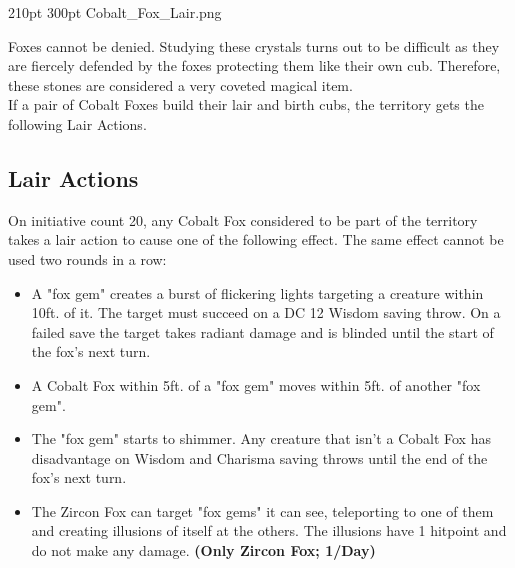 
\MonsterBannerGraphic%
	{}%
	{210pt}%
	{300pt}%
	{Cobalt_Fox_Lair.png}%
	{}%
	
%
	
Foxes cannot be denied. Studying these crystals turns out to be difficult as they are fiercely defended by the foxes protecting them like their own cub. Therefore, these stones are considered a very coveted magical item.\\
If a pair of Cobalt Foxes build their lair and birth cubs, the territory gets the following Lair Actions.

\subsection*{Lair Actions}
On initiative count 20, any Cobalt Fox considered to be part of the territory takes a lair action to cause one of the following effect. The same effect cannot be used two rounds in a row:
\begin{itemize}
	\item A "fox gem" creates a burst of flickering lights targeting a creature within 10ft. of it. The target must succeed on a DC 12 Wisdom saving throw. On a failed save the target takes  radiant damage and is blinded until the start of the fox's next turn.
	\item A Cobalt Fox within 5ft. of a "fox gem" moves within 5ft. of another "fox gem".
	\item The "fox gem" starts to shimmer. Any creature that isn't a Cobalt Fox has disadvantage on Wisdom and Charisma saving throws until the end of the fox's next turn.
	\item The Zircon Fox can target  "fox gems" it can see, teleporting to one of them and creating illusions of itself at the others. The illusions have 1 hitpoint and do not make any damage. \textbf{(Only Zircon Fox; 1/Day)}
\end{itemize}

